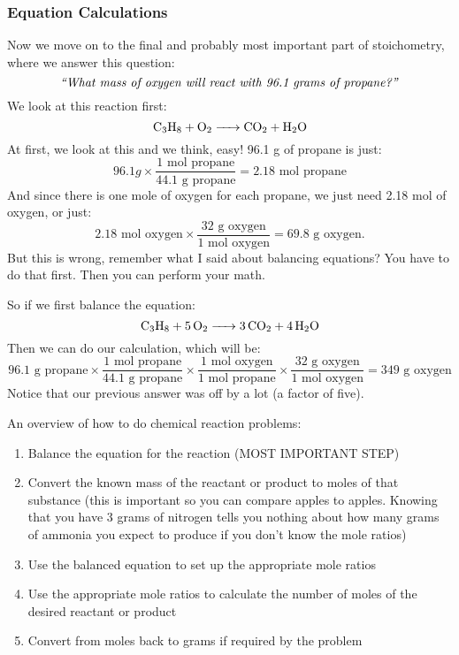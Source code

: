    \subsubsection{Equation Calculations}
    Now we move on to the final and probably most important part of stoichometry, where we answer this question:
    $$\text{\textit{``What mass of oxygen will react with 96.1 grams of propane?''}}$$
    We look at this reaction first:
    $$\ce{C3H8 + O2 -> CO2 + H2O}$$
    At first, we look at this and we think, easy! 96.1 g of propane is just:
    $$96.1 g \times \frac{1 \text{ mol propane}}{44.1 \text{ g propane}} =  2.18 \text{ mol propane}$$
    And since there is one mole of oxygen for each propane, we just need 2.18 mol of oxygen, or just:
    $$2.18 \text{ mol oxygen} \times \frac{32 \text{ g oxygen}}{1 \text{ mol oxygen}} = 69.8 \text{ g oxygen}.$$
    But this is wrong, remember what I said about balancing equations? You have to do that first. Then you can perform your math. \par
    So if we first balance the equation:
    $$\ce{C3H8 + 5O2 -> 3CO2 + 4H2O}$$
    Then we can do our calculation, which will be:
    $$96.1 \text{ g propane} \times \frac{1 \text{ mol propane}}{44.1 \text{ g propane}} \times \frac{1 \text{ mol oxygen}}{1 \text{ mol propane}} \times \frac{32 \text{ g oxygen}}{1 \text{ mol oxygen}} = \boxed{349 \text{ g oxygen}}$$
    Notice that our previous answer was off by a lot (a factor of five). \par
    An overview of how to do chemical reaction problems:
    \begin{enumerate}
        \item Balance the equation for the reaction (MOST IMPORTANT STEP)
        \item Convert the known mass of the reactant or product to moles of that substance (this is important so you can compare apples to apples. Knowing that you have 3 grams of nitrogen tells you nothing about how many grams of ammonia you expect to produce if you don't know the mole ratios)
        \item Use the balanced equation to set up the appropriate mole ratios
        \item Use the appropriate mole ratios to calculate the number of moles of the desired reactant or product
        \item Convert from moles back to grams if required by the problem
    \end{enumerate}
